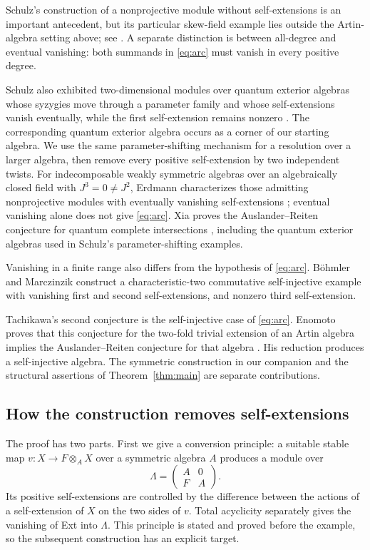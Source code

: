 Schulz's construction of a nonprojective module without self-extensions
\cite{Schulz1994} is an important antecedent, but its particular
skew-field example lies outside the Artin-algebra setting above; see
\cite[Introduction]{DiverisPurin2012}. A separate distinction is between
all-degree and eventual vanishing: both summands in \eqref{eq:arc}
must vanish in every positive degree.

Schulz also exhibited two-dimensional modules over quantum exterior
algebras whose syzygies move through a parameter family and whose
self-extensions vanish eventually, while the first self-extension
remains nonzero \cite[Example~7]{Schulz1995}. The corresponding quantum
exterior algebra occurs as a corner of our starting algebra. We use
the same parameter-shifting mechanism for a resolution over a larger
algebra, then remove every positive self-extension by two independent twists.
For indecomposable weakly symmetric algebras over an algebraically closed
field with $J^3=0\ne J^2$, Erdmann characterizes those admitting
nonprojective modules with eventually vanishing self-extensions
\cite{Erdmann2017}; eventual vanishing alone does not give
\eqref{eq:arc}.
Xia proves the Auslander--Reiten conjecture for quantum complete
intersections \cite{Xia2026}, including the quantum exterior algebras
used in Schulz's parameter-shifting examples.

Vanishing in a finite range also differs from the hypothesis of
\eqref{eq:arc}. B\"ohmler and
Marczinzik \cite[Theorem 3.1 and the end of Section 3]{BoehmlerMarczinzik2026}
construct a characteristic-two commutative self-injective example with
vanishing first and second self-extensions, and nonzero third
self-extension.

Tachikawa's second conjecture is the self-injective case of
\eqref{eq:arc}. Enomoto proves that this conjecture for
the two-fold trivial extension of an Artin algebra implies the
Auslander--Reiten conjecture for that algebra
\cite[Theorem~3.1]{Enomoto2026}. His reduction produces a self-injective
algebra. The symmetric construction
in our companion and the structural assertions of Theorem~\ref{thm:main}
are separate contributions.

\subsection{How the construction removes self-extensions}

The proof has two parts. First we give a conversion principle: a
suitable stable map $v:X\to F\otimes_A X$ over a symmetric algebra
$A$ produces a module over
\[
 \Lambda=\begin{pmatrix}A&0\\F&A\end{pmatrix}.
\]
Its positive self-extensions are controlled by the difference between
the actions of a self-extension of $X$ on the two sides of $v$.
Total acyclicity separately gives the vanishing of Ext into $\Lambda$.
This principle is stated and proved before the example, so the
subsequent construction has an explicit target.

